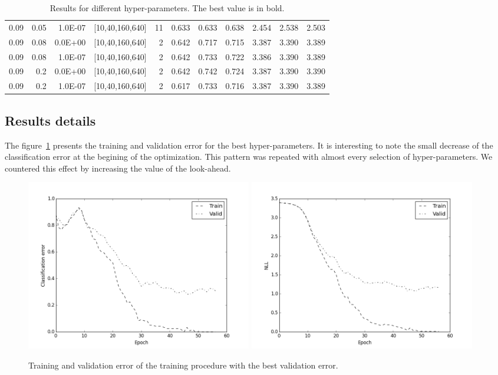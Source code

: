 \begin{table}[f]
\begin{tabular}{@{}rrrrrrrrrrr@{}}
0.09 & 0.05 & 1.0E-07 & {[}10,40,160,640{]} & 11 & 0.633 & 0.633 & 0.638 & 2.454 & 2.538 & 2.503 \\
0.09 & 0.08 & 0.0E+00 & {[}10,40,160,640{]} & 2 & 0.642 & 0.717 & 0.715 & 3.387 & 3.390 & 3.389 \\
0.09 & 0.08 & 1.0E-07 & {[}10,40,160,640{]} & 2 & 0.642 & 0.733 & 0.722 & 3.386 & 3.390 & 3.389 \\
0.09 & 0.2 & 0.0E+00 & {[}10,40,160,640{]} & 2 & 0.642 & 0.742 & 0.724 & 3.387 & 3.390 & 3.390 \\
0.09 & 0.2 & 1.0E-07 & {[}10,40,160,640{]} & 2 & 0.617 & 0.733 & 0.716 & 3.387 & 3.390 & 3.389 \\ \bottomrule
\end{tabular}
\caption{Results for different hyper-parameters. The best value is in bold.}
\end{table}

\subsection{Results details}
The figure~\ref{fig:results_bestrun} presents the training and validation error for the best hyper-parameters. It is interesting to note the small decrease of the classification error at the begining of the optimization. This pattern was repeated with almost every selection of hyper-parameters. We countered this effect by increasing the value of the look-ahead.


\begin{figure}[htbf]
\label{fig:results_bestrun}
\includegraphics[width=0.48\textwidth]{result1.png} 
\includegraphics[width=0.48\textwidth]{result2.png} 
\caption{Training and validation error of the training procedure with the best validation error.}
\end{figure}

